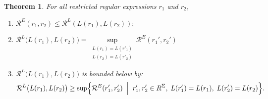 \documentclass{article}
\newtheorem{definition}{Definition}[section]
\newtheorem{theorem}{Theorem}[section]
\begin{document}
 

\begin{theorem}\label{thm:Rr-RL-bridge}For all restricted regular expressions $r_1$ and $r_2$,
\begin{enumerate} 
\item$\mathcal R^E(r_1,r_2)\leq \mathcal R^L(L(r_1),L(r_2));$

\item{\color{blue}$\mathcal{R}^L\bigl(L(r_1),L(r_2)\bigr)=\sup\limits_{\substack{L(r_1)=L(r'_1)\\L(r_2)=L(r'_2)}}\mathcal{R}^E(r_1',r_2')$}

\item {\color{red}$\mathcal{R}^L\bigl(L(r_1),L(r_2)\bigr)$ is bounded below by:
\[\mathcal{R}^L\bigl(L(r_1),L(r_2)\bigr)\geq
\sup\Bigl\{\mathcal{R}^E(r_1',r_2')\;\Bigm|\; r_1',r_2' \in R^\Sigma,\; L(r_1')=L(r_1),\;L(r_2')=L(r_2)\Bigr\}.\]}
\end{enumerate}
\end{theorem}
\end{document}

